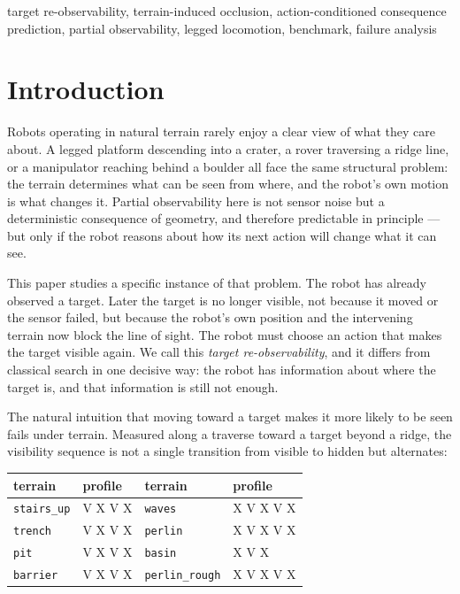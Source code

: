 \documentclass[conference]{IEEEtran}
\begin{document}
\begin{IEEEkeywords}
target re-observability, terrain-induced occlusion, action-conditioned consequence
prediction, partial observability, legged locomotion, benchmark, failure analysis
\end{IEEEkeywords}

\section{Introduction}

Robots operating in natural terrain rarely enjoy a clear view of what they care
about. A legged platform descending into a crater, a rover traversing a ridge line, or
a manipulator reaching behind a boulder all face the same structural problem: the
terrain determines what can be seen from where, and the robot's own motion is what
changes it. Partial observability here is not sensor noise but a deterministic
consequence of geometry, and therefore predictable in principle --- but only if the
robot reasons about how its next action will change what it can see.

This paper studies a specific instance of that problem. The robot has already
observed a target. Later the target is no longer visible, not because it moved or the
sensor failed, but because the robot's own position and the intervening terrain now
block the line of sight. The robot must choose an action that makes the target visible
again. We call this \emph{target re-observability}, and it differs from classical
search in one decisive way: the robot has information about where the target is, and
that information is still not enough.

The natural intuition that moving toward a target makes it more likely to be seen
fails under terrain. Measured along a traverse toward a target beyond a ridge, the
visibility sequence is not a single transition from visible to hidden but alternates:

\begin{center}
\small
\begin{tabular}{llll}
\toprule
terrain & profile & terrain & profile\\
\midrule
\texttt{stairs\_up}   & V X V X   & \texttt{waves}        & X V X V X\\
\texttt{trench}       & V X V X   & \texttt{perlin}       & X V X V X\\
\texttt{pit}          & V X V X   & \texttt{basin}        & X V X\\
\texttt{barrier}      & V X V X   & \texttt{perlin\_rough}& X V X V X\\
\bottomrule
\end{tabular}
\end{center}
\end{document}
